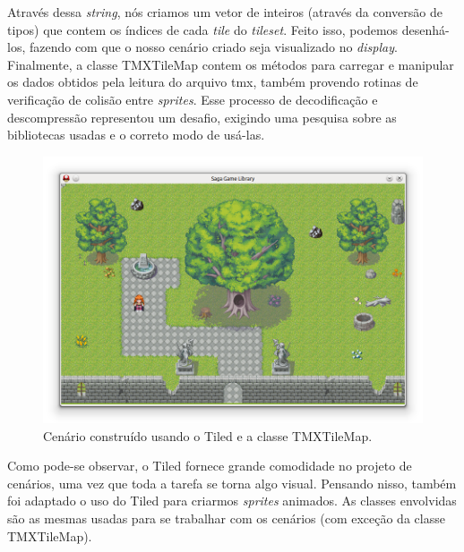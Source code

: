 Através dessa \textit{string}, nós criamos um vetor de inteiros (através da conversão de tipos) que contem os índices de cada \textit{tile} do \textit{tileset}. Feito isso, podemos desenhá-los, fazendo com que o nosso cenário criado seja visualizado no \textit{display}. Finalmente, a classe TMXTileMap contem os métodos para carregar e manipular os dados obtidos pela leitura do arquivo tmx, também provendo rotinas de verificação de colisão entre \textit{sprites}. Esse processo de decodificação e descompressão representou um desafio, exigindo uma pesquisa sobre as bibliotecas usadas e o correto modo de usá-las.
%
%
\begin{figure}[ht]
    \centering
		\caption{Cenário construído usando o Tiled e a classe TMXTileMap.}
    \label{snapshot1}
    \includegraphics[scale = 0.60]{Imagens/snapshot1.png}
\end{figure}
%
\par 
Como pode-se observar, o Tiled fornece grande comodidade no projeto de cenários, uma vez que toda a tarefa se torna algo visual. Pensando nisso, também foi adaptado o uso do Tiled para criarmos \textit{sprites} animados. As classes envolvidas são as mesmas usadas para se trabalhar com os cenários (com exceção da classe TMXTileMap).
%
%
